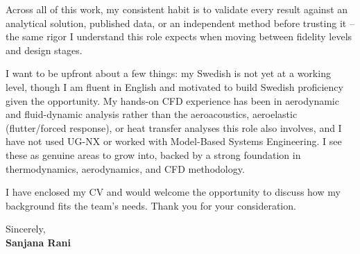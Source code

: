 \documentclass[a4paper,8pt]{article}
\begin{document}
Across all of this work, my consistent habit is to validate every result against an analytical solution, published data, or an independent method before trusting it -- the same rigor I understand this role expects when moving between fidelity levels and design stages.

I want to be upfront about a few things: my Swedish is not yet at a working level, though I am fluent in English and motivated to build Swedish proficiency given the opportunity. My hands-on CFD experience has been in aerodynamic and fluid-dynamic analysis rather than the aeroacoustics, aeroelastic (flutter/forced response), or heat transfer analyses this role also involves, and I have not used UG-NX or worked with Model-Based Systems Engineering. I see these as genuine areas to grow into, backed by a strong foundation in thermodynamics, aerodynamics, and CFD methodology.

I have enclosed my CV and would welcome the opportunity to discuss how my background fits the team's needs. Thank you for your consideration.

Sincerely,\\
\textbf{Sanjana Rani}
\end{document}

